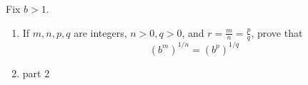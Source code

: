 \begin{prob}
\label{prob6}
Fix $b > 1$.\\

\begin{enumerate}
    \item  If $m,n,p,q$ are integers, $n>0,q>0$, and $r=\frac{m}{n}=\frac{p}{q}$, prove that
    \begin{equation*}
        (b^m)^{1/n}=(b^p)^{1/q}
    \end{equation*}

    \item part 2
\end{enumerate}



\end{prob}

 

%
